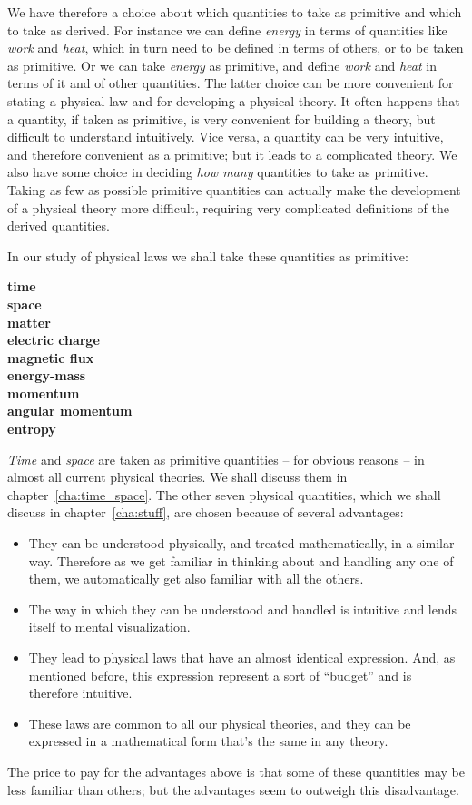 \documentclass[a4paper,12pt,%
onecolumn,oneside,%
british%
]{memoir}
\renewcommand*{\|}[1][]{\nonscript\:#1\vert\nonscript\:\mathopen{}}
\newcommand*{\chap}{chapter}%
\begin{document}
We have therefore a choice about which quantities to take as primitive and which to take as derived. For instance we can define \emph{energy} in terms of quantities like \emph{work} and \emph{heat}, which in turn need to be defined in terms of others, or to be taken as primitive. Or we can take \emph{energy} as primitive, and define \emph{work} and \emph{heat} in terms of it and of other quantities. The latter choice can be more convenient for stating a physical law and for developing a physical theory. It often happens that a quantity, if taken as primitive, is very convenient for building a theory, but difficult to understand intuitively. Vice versa, a quantity can be very intuitive, and therefore convenient as a primitive; but it leads to a complicated theory. We also have some choice in deciding \emph{how many} quantities to take as primitive. Taking as few as possible primitive quantities can actually make the development of a physical theory more difficult, requiring very complicated definitions of the derived quantities.

\medskip

In our study of physical laws we shall take these quantities as primitive:
\begin{center}\bfseries
  time \\ space \\[2\jot] matter \\ electric charge \\ magnetic flux \\ energy-mass \\ momentum \\ angular momentum \\ entropy
\end{center}

\emph{Time} and \emph{space} are taken as primitive quantities -- for obvious reasons -- in almost all current physical theories. We shall discuss them in \chap~\ref{cha:time_space}. The other seven physical quantities, which we shall discuss in \chap~\ref{cha:stuff}, are chosen because of several advantages:
\begin{itemize}[label={\small{}}]
\item They can be understood physically, and treated mathematically, in a similar way. Therefore as we get familiar in thinking about and handling any one of them, we automatically get also familiar with all the others.
\item The way in which they can be understood and handled is intuitive and lends itself to mental visualization.
\item They lead to physical laws that have an almost identical expression. And, as mentioned before, this expression represent a sort of \enquote{budget} and is therefore intuitive.
\item These laws are common to all our physical theories, and they can be expressed in a mathematical form that's the same in any theory.
\end{itemize}
The price to pay for the advantages above is that some of these quantities may be less familiar than others; but the advantages seem to outweigh this disadvantage.
\end{document}
